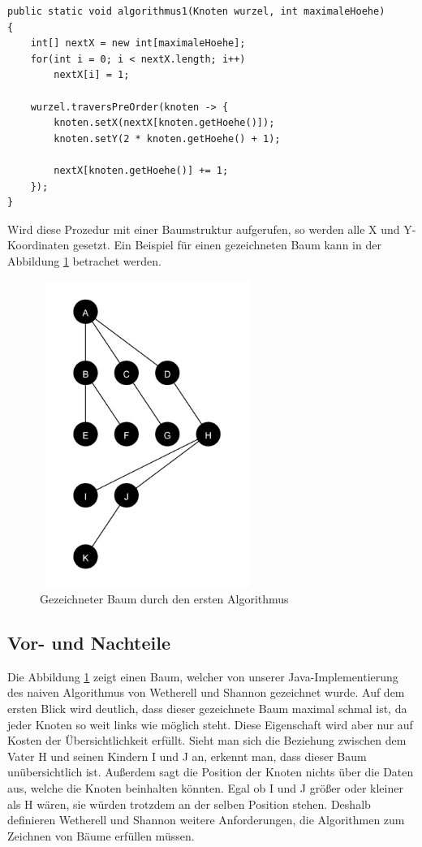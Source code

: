 \begin{lstlisting}
public static void algorithmus1(Knoten wurzel, int maximaleHoehe) 
{
	int[] nextX = new int[maximaleHoehe];
	for(int i = 0; i < nextX.length; i++)
		nextX[i] = 1;
	
	wurzel.traversPreOrder(knoten -> {
		knoten.setX(nextX[knoten.getHoehe()]);
		knoten.setY(2 * knoten.getHoehe() + 1);
		
		nextX[knoten.getHoehe()] += 1;
	});
}
\end{lstlisting}

Wird diese Prozedur mit einer Baumstruktur aufgerufen, so werden alle X und Y-Koordinaten gesetzt.
Ein Beispiel für einen gezeichneten Baum kann in der Abbildung \ref{pic:baum_algo_1} betrachet werden.

\begin{figure}[H]
    \centering
    \includegraphics[width=7cm, height=10cm]{abbildungen/baum_algo_1}
    \caption{Gezeichneter Baum durch den ersten Algorithmus}
    \label{pic:baum_algo_1} 
\end{figure}

\subsection{Vor- und Nachteile}
Die Abbildung \ref{pic:baum_algo_1} zeigt einen Baum, welcher von unserer Java-Implementierung des naiven Algorithmus von Wetherell und Shannon
gezeichnet wurde.
Auf dem ersten Blick wird deutlich, dass dieser gezeichnete Baum maximal schmal ist, da jeder Knoten so weit links wie möglich steht.
Diese Eigenschaft wird aber nur auf Kosten der Übersichtlichkeit erfüllt. Sieht man sich die Beziehung zwischen dem Vater H und seinen Kindern
I und J an, erkennt man, dass dieser Baum unübersichtlich ist. Außerdem sagt die Position der Knoten nichts über die Daten aus, welche die Knoten
beinhalten könnten. Egal ob I und J größer oder kleiner als H wären, sie würden trotzdem an der selben Position stehen. Deshalb definieren
Wetherell und Shannon weitere Anforderungen, die Algorithmen zum Zeichnen von Bäume erfüllen müssen.

